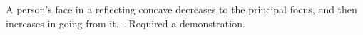 A person's face in a reflecting concave decreases to the 
principal focus, and then increases in going from 
it. - Required a demonstration.
